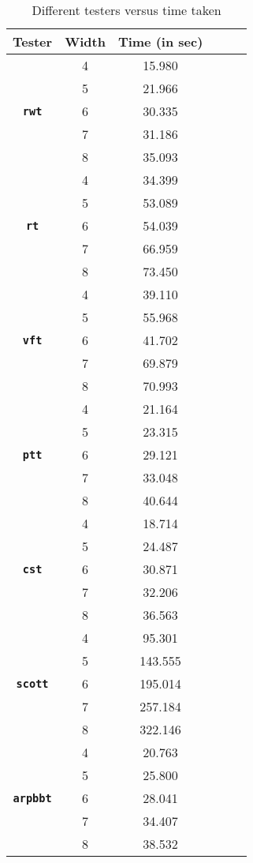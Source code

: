 \begin{table}[!ht]
    
    \caption{Different testers versus time taken}
  \label{tab:time_profile}
  \centering
  \begin{tabular}{cccccc}
  \\
    \toprule
    \textbf{Tester} & \textbf{Width} & \textbf{Time (in sec)} \\
    \midrule
    & 4 & 15.980\\
    & 5 & 21.966\\
    \textbf{\texttt{rwt}}& 6 & 30.335\\
    & 7 & 31.186\\
    & 8 & 35.093\\
    \midrule
    & 4 & 34.399\\
    & 5 & 53.089\\
    \textbf{\texttt{rt}}& 6 & 54.039\\
    & 7 & 66.959\\
    & 8 & 73.450\\
    \midrule
    & 4 & 39.110\\
    & 5 & 55.968\\
    \textbf{\texttt{vft}}& 6 & 41.702\\
    & 7 & 69.879\\
    & 8 & 70.993\\
    \midrule
    & 4 & 21.164\\
    & 5 & 23.315\\
    \textbf{\texttt{ptt}}& 6 & 29.121\\
    & 7 & 33.048\\
    & 8 & 40.644\\
    \midrule
    & 4 & 18.714\\
    & 5 & 24.487\\
    \textbf{\texttt{cst}}& 6 & 30.871\\
    & 7 & 32.206\\
    & 8 & 36.563\\
    \midrule
    & 4 & 95.301\\
    & 5 & 143.555\\
    \textbf{\texttt{scott}}& 6 & 195.014\\
    & 7 & 257.184\\
    & 8 & 322.146\\
    \midrule
    & 4 & 20.763\\
    & 5 & 25.800\\
    \textbf{\texttt{arpbbt}}& 6 & 28.041\\
    & 7 & 34.407\\
    & 8 & 38.532\\
\bottomrule
    \end{tabular}
\end{table}

